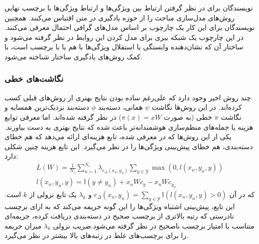 نویسندگان \cite{ topicmodel} برای در نظر گرفتن ارتباط بین ویژگی‌ها و ارتباط ویژگی‌ها با برچسب نهایی روش‌های مدل‌سازی مباحث را از حوزه یادگیری در متن اقتباس می‌کنند. همچنین  نویسندگان \cite{ unified13} برای این کار یک چارچوب بر اساس مدل‌های گرافی احتمال معرفی می‌کنند. در این چارچوب یک شبکه بیزی  برای مدل کردن این روابط در نظر گرفته می‌شود و ساختار آن که نشان‌دهنده وابستگی یا استقلال ویژگی‌ها با هم یا با برچسب است، با کمک روش‌های یادگیری ساختار 
شناخته می‌شود. 


\subsubsection{نگاشت‌های خطی}\label{linear}
چند روش اخیر وجود دارد که علی‌رغم ساده بودن نتایج بهتری از روش‌های قبلی کسب کرده‌اند. در این روش‌ها  نگاشت $\psi$ همانی، دسته‌بند $\phi$ دسته‌بند نزدیک‌ترین همسایه و نگاشت $\pi$ خطی (به صورت $\pi(x) = xW$) در نظر گرفته شده‌اند. اما معرفی توابع هزینه یا جمله‌های منظم‌سازی 
هوشمندانه‌تر باعث شده که نتایج بهتری به دست بیاورند. یکی از این روش‌ها که در \cite{ akata13} معرفی شده، تابع هزینه‌ای ارائه می‌دهد که هم خطای دسته‌بندی، هم خطای پیش‌بینی ویژگی‌ها را در نظر می‌گیرد. این تابع هزینه چنین شکلی دارد:
\begin{align}
L(W) = \frac{1}{N_s} \sum_{n=1}^{N_s} \lambda_{r_\Delta (x_n, y_n)} \sum_{y \in \mathcal{Y}} \max (0, \mathit{l}(x_n, y_n, y) ) \\
\mathit{l}(x_n,y_n,y) = \mathbb{I}(y \neq y_n) + x_nWc_y - x_nWc_{y_n}
\end{align}
که در آن 
$ r_\Delta (x_n, y_n) =  \sum_{y \in \mathcal{Y}} \mathbb{I}(\mathit{l}(x_n, y_n, y)  > 0) $
 و $\lambda_k$ یک تابع نزولی از $k$ است. این تابع، پیش‌بینی اشتباه ویژگی‌ها را  این گونه جریمه می‌کند که به ازای برچسب نادرستی که رتبه بالاتری از برچسب صحیح در دسته‌بندی دریافت کرده، جریمه‌ای متناسب با امتیاز برچسب ناصحیح در نظر گرفته می‌شود.ضریب نزولی $\lambda_k$ میزان جریمه را برای برچسب‌های غلط در رتبه‌های بالا بیشتر در نظر می‌گیرد.

